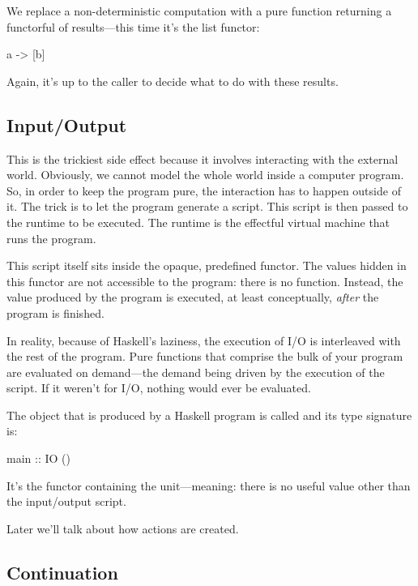 \documentclass[DaoFP]{subfiles}
\begin{document}
We replace a non-deterministic computation  with a pure function returning a functorful of results---this time it's the list functor:
\begin{haskell}
a -> [b]
\end{haskell}
Again, it's up to the caller to decide what to do with these results.

\subsection{Input/Output}

This is the trickiest side effect because it involves interacting with the external world. Obviously, we cannot model the whole world inside a computer program. So, in order to keep the program pure, the interaction has to happen outside of it. The trick is to let the program generate a script. This script is then passed to the runtime to be executed. The runtime is the effectful virtual machine that runs the program. 

This script itself sits inside the opaque, predefined  functor. The values hidden in this functor are not accessible to the program: there is no  function. Instead, the  value produced by the program is executed, at least conceptually, \emph{after} the program is finished. 

In reality, because of Haskell's laziness, the execution of I/O is interleaved with the rest of the program.  Pure functions that comprise the bulk of your program are evaluated on demand---the demand being driven by the execution of the  script. If it weren't for I/O, nothing would ever be evaluated.

The  object that is produced by a Haskell program is called  and its type signature is:
\begin{haskell}
main :: IO ()
\end{haskell}
It's the  functor containing the unit---meaning: there is no useful value other than the input/output script.

Later we'll talk about how  actions are created.

\subsection{Continuation}
\end{document}
